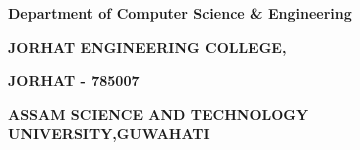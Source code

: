 \begin{titlepage}
\begin{center}
    
    {\large \textbf{Department of Computer Science \& Engineering}\par}

    {\large \textbf{JORHAT ENGINEERING COLLEGE,}}
    {\large \textbf{JORHAT - 785007}\par}
    { \textbf{ASSAM SCIENCE AND TECHNOLOGY UNIVERSITY,GUWAHATI}}
\end{center}
\end{titlepage}